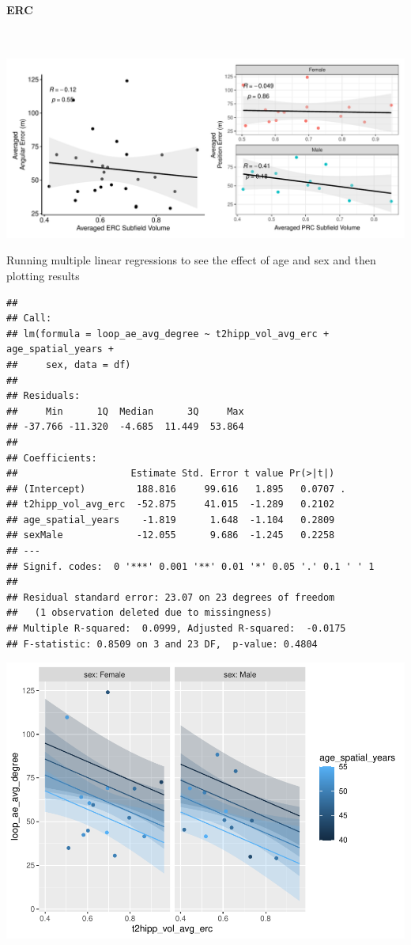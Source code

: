 \documentclass[
]{article}
\begin{document}
\newpage
\paragraph{ERC}

~ \vspace{1cm}

\includegraphics{hippocampal_subfield_files/figure-latex/unnamed-chunk-6-1.pdf}

\vspace{1cm}

Running multiple linear regressions to see the effect of age and sex and
then plotting results

\begin{verbatim}
## 
## Call:
## lm(formula = loop_ae_avg_degree ~ t2hipp_vol_avg_erc + age_spatial_years + 
##     sex, data = df)
## 
## Residuals:
##     Min      1Q  Median      3Q     Max 
## -37.766 -11.320  -4.685  11.449  53.864 
## 
## Coefficients:
##                    Estimate Std. Error t value Pr(>|t|)  
## (Intercept)         188.816     99.616   1.895   0.0707 .
## t2hipp_vol_avg_erc  -52.875     41.015  -1.289   0.2102  
## age_spatial_years    -1.819      1.648  -1.104   0.2809  
## sexMale             -12.055      9.686  -1.245   0.2258  
## ---
## Signif. codes:  0 '***' 0.001 '**' 0.01 '*' 0.05 '.' 0.1 ' ' 1
## 
## Residual standard error: 23.07 on 23 degrees of freedom
##   (1 observation deleted due to missingness)
## Multiple R-squared:  0.0999, Adjusted R-squared:  -0.0175 
## F-statistic: 0.8509 on 3 and 23 DF,  p-value: 0.4804
\end{verbatim}

\includegraphics{hippocampal_subfield_files/figure-latex/Avg ERC + avg angular error MLR-1.pdf}
\vspace{1cm}
\end{document}
